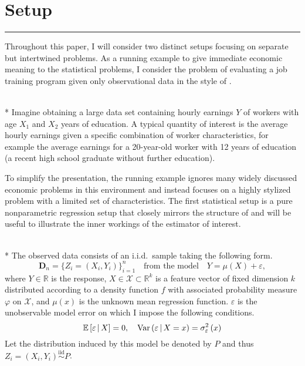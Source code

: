 \section{Setup}\label{sec:setup}
\hrule
Throughout this paper, I will consider two distinct setups focusing on separate but intertwined problems.
As a running example to give immediate economic meaning to the statistical problems, I consider the problem of evaluating a job training program given only observational data in the style of \citet{lalonde_evaluating_1986}.
\begin{boxE}
	\begin{exmp}\label{asm:run_exmp}\mbox{}\\*
        Imagine obtaining a large data set containing hourly earnings $Y$ of workers with age $X_1$ and $X_2$ years of education.
        A typical quantity of interest is the average hourly earnings given a specific combination of worker characteristics, for example the average earnings for a 20-year-old worker with 12 years of education (a recent high school graduate without further education).
	\end{exmp}
\end{boxE}
To simplify the presentation, the running example ignores many widely discussed economic problems in this environment and instead focuses on a highly stylized problem with a limited set of characteristics.
The first statistical setup is a pure nonparametric regression setup that closely mirrors the structure of \citet{demirkaya_optimal_2024} and will be useful to illustrate the inner workings of the estimator of interest.
\begin{boxD}
	\begin{asm}\label{asm:npr_dgp}\mbox{}\\*
		The observed data consists of an i.i.d.\ sample taking the following form.
		\begin{equation}\label{DGP1}
			\mathbf{D}_n = \{Z_{i} = (X_{i}, Y_{i})\}_{i = 1}^{n}
			\quad \text{from the model} \quad
			Y = \mu(X) + \varepsilon,
		\end{equation}
		where $Y \in \mathbb{R}$ is the response, $X \in \mathcal{X} \subset \mathbb{R}^k$ is a feature vector of fixed dimension $k$ distributed according to a density function $f$ with associated probability measure $\varphi$ on $\mathcal{X}$, and $\mu(x)$ is the unknown mean regression function.
		$\varepsilon$ is the unobservable model error on which I impose the following conditions.
		\begin{equation}
			\mathbb{E}\left[\varepsilon \, \middle| \, X\right] = 0, \quad
			\text{Var}\left(\varepsilon \, \middle| \, X = x\right) = \sigma_{\varepsilon}^2\left(x\right)
		\end{equation}
		Let the distribution induced by this model be denoted by $P$ and thus $Z_{i} = \left(X_{i}, Y_{i}\right) \overset{\text{iid}}{\sim} P$.
	\end{asm}
\end{boxD}

